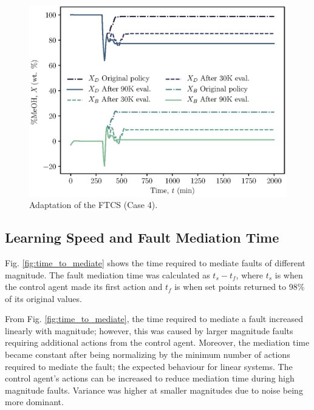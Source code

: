 \begin{figure}[h]
    \begin{center}
        \includegraphics{images/ftc/Case4_Plot.eps}
        \caption{\label{fig:case_study4} Adaptation of the FTCS (Case 4).}
    \end{center}
\end{figure}

\subsection{Learning Speed and Fault Mediation Time}
Fig. \ref{fig:time_to_mediate} shows the time required to mediate faults of different magnitude. The fault mediation time was calculated as $t_{s} - t_{f}$, where $t_{s}$ is when the control agent made its first action and $t_f$ is when set points returned to 98\% of its original values.

From Fig. \ref{fig:time_to_mediate}, the time required to mediate a fault increased linearly with magnitude; however, this was caused by larger magnitude faults requiring additional actions from the control agent.  Moreover, the mediation time became constant after being normalizing by the minimum number of actions required to mediate the fault; the expected behaviour for linear systems. The control agent's actions can be increased to reduce mediation time during high magnitude faults.  Variance was higher at smaller magnitudes due to noise being more dominant.

